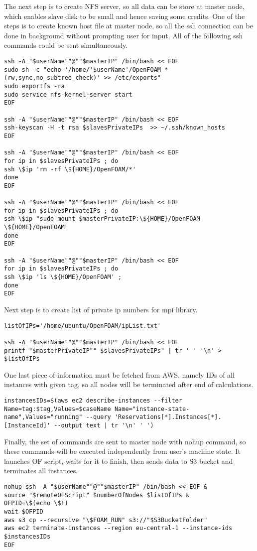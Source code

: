 \documentclass[11pt,english]{article}
\begin{document}
The next step is to create NFS server, so all data can be store at master node, which enables slave disk to be small and hence saving some credits. One of the steps is to create known host file at master node, so all the ssh connection can be done in background without prompting user for input. All of the following ssh commands could be sent simultaneously.
\begin{lstlisting}
ssh -A "$userName""@""$masterIP" /bin/bash << EOF
sudo sh -c "echo '/home/'$userName'/OpenFOAM *(rw,sync,no_subtree_check)' >> /etc/exports"
sudo exportfs -ra
sudo service nfs-kernel-server start
EOF

ssh -A "$userName""@""$masterIP" /bin/bash << EOF
ssh-keyscan -H -t rsa $slavesPrivateIPs  >> ~/.ssh/known_hosts
EOF

ssh -A "$userName""@""$masterIP" /bin/bash << EOF
for ip in $slavesPrivateIPs ; do 
ssh \$ip 'rm -rf \${HOME}/OpenFOAM/*' 
done
EOF

ssh -A "$userName""@""$masterIP" /bin/bash << EOF
for ip in $slavesPrivateIPs ; do
ssh \$ip "sudo mount $masterPrivateIP:\${HOME}/OpenFOAM \${HOME}/OpenFOAM"
done
EOF

ssh -A "$userName""@""$masterIP" /bin/bash << EOF
for ip in $slavesPrivateIPs ; do
ssh \$ip 'ls \${HOME}/OpenFOAM' ;
done
EOF
\end{lstlisting}
Next step is to create list of private ip numbers for mpi library.
\begin{lstlisting}
listOfIPs='/home/ubuntu/OpenFOAM/ipList.txt'

ssh -A "$userName""@""$masterIP" /bin/bash << EOF
printf "$masterPrivateIP"" $slavesPrivateIPs" | tr ' ' '\n' > $listOfIPs
\end{lstlisting}
One last piece of information must be fetched from AWS, namely IDs of all instances with given tag, so all nodes will be terminated after end of calculations.
\begin{lstlisting}
instancesIDs=$(aws ec2 describe-instances --filter Name=tag:$tag,Values=$caseName Name="instance-state-name",Values="running" --query 'Reservations[*].Instances[*].[InstanceId]' --output text | tr '\n' ' ')
\end{lstlisting}
Finally, the set of commands are sent to master node with nohup command, so these commands will be executed independently from user's machine state. It launches OF script, waits for it to finish, then sends data to S3 bucket and terminates all instances.
\begin{lstlisting}
nohup ssh -A "$userName""@""$masterIP" /bin/bash << EOF &
source "$remoteOFScript" $numberOfNodes $listOfIPs &
OFPID=\$(echo \$!)
wait $OFPID
aws s3 cp --recursive "\$FOAM_RUN" s3://"$S3BucketFolder"
aws ec2 terminate-instances --region eu-central-1 --instance-ids $instancesIDs
EOF
\end{lstlisting}
\end{document}
